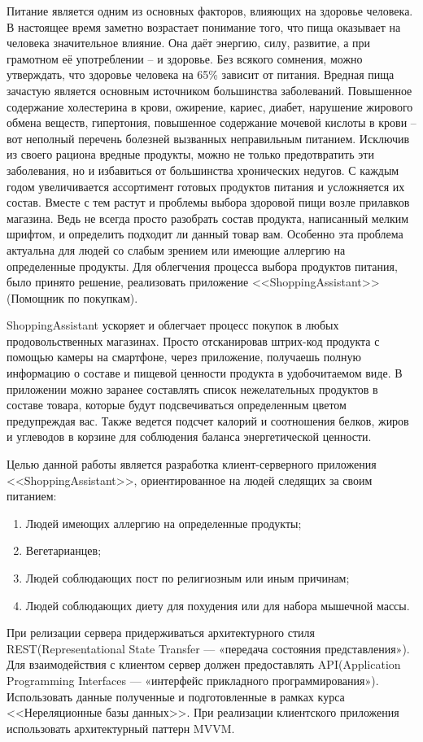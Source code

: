 

Питание является одним из основных факторов, влияющих на здоровье человека. В настоящее время заметно возрастает понимание того, что пища оказывает на человека значительное влияние. Она даёт энергию, силу, развитие, а при грамотном её употреблении – и здоровье. Без всякого сомнения, можно утверждать, что здоровье человека на 65\% зависит от питания. Вредная пища зачастую является основным источником большинства заболеваний. Повышенное содержание холестерина в крови, ожирение, кариес, диабет, нарушение жирового обмена веществ, гипертония, повышенное содержание мочевой кислоты в крови – вот неполный перечень болезней вызванных неправильным питанием. Исключив из своего рациона вредные продукты, можно не только предотвратить эти заболевания, но и избавиться от большинства хронических недугов. С каждым годом увеличивается ассортимент готовых продуктов питания и усложняется их состав. Вместе с тем растут и проблемы выбора здоровой пищи возле прилавков магазина. Ведь не всегда просто разобрать состав продукта, написанный мелким шрифтом, и определить подходит ли данный товар вам. Особенно эта проблема актуальна для людей со слабым зрением или имеющие аллергию на определенные продукты. Для облегчения процесса выбора  продуктов питания, было принято решение, реализовать приложение <<ShoppingAssistant>>(Помощник по покупкам).

	ShoppingAssistant ускоряет и облегчает процесс покупок в любых
продовольственных магазинах. Просто отсканировав штрих-код продукта
с помощью камеры на смартфоне, через приложение, получаешь полную
информацию о составе и пищевой ценности продукта в удобочитаемом
виде. В приложении можно заранее составлять список нежелательных
продуктов в составе товара, которые будут подсвечиваться определенным цветом предупреждая вас. Также ведется подсчет калорий и соотношения белков, жиров и углеводов в корзине для соблюдения баланса энергетической ценности.

Целью данной работы является разработка клиент-серверного приложения <<ShoppingAssistant>>, ориентированное на людей следящих за
своим питанием:
\begin{enumerate}
	\item Людей имеющих аллергию на определенные продукты;
	\item Вегетарианцев;
	\item Людей соблюдающих пост по религиозным или иным причинам;
	\item Людей соблюдающих диету для похудения или для набора мышечной массы.
\end{enumerate}

При релизации сервера придерживаться архитектурного стиля REST(Representational State Transfer — «передача состояния представления»). Для взаимодействия с клиентом сервер должен предоставлять API(Application Programming Interfaces  — «интерфейс прикладного программирования»). Использовать данные полученные и подготовленные в рамках курса <<Нереляционные базы данных>>.
При реализации клиентского приложения использовать архитектурный паттерн MVVM.
\clearpage